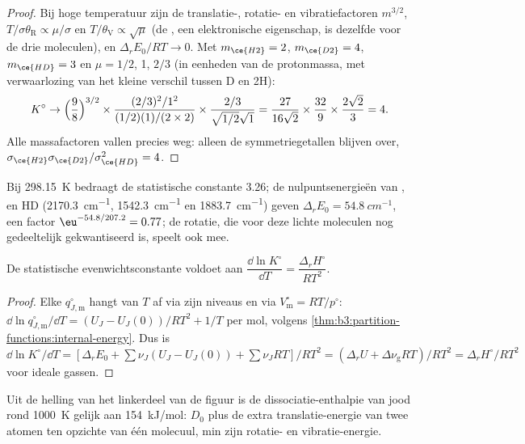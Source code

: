 \begin{proof}
Bij hoge temperatuur zijn de translatie-, rotatie- en vibratiefactoren
$m^{3/2}$, $T/\sigma\theta_{\mathrm R} \propto \mu/\sigma$ en $T/\theta_{\mathrm V} \propto \sqrt\mu$ (de
, een elektronische eigenschap, is dezelfde voor de drie
moleculen), en $\Delta_rE_0/RT \to 0$.
Met $m_{\ce{H2}} = 2$, $m_{\ce{D2}} = 4$, $m_{\ce{HD}} = 3$ en $\mu = 1/2$, 1, $2/3$ (in eenheden van de
protonmassa, met verwaarlozing van het kleine verschil tussen D en 2H):
\[
  K^\circ \to \Bigl(\frac{9}{8}\Bigr)^{3/2} \times \frac{(2/3)^2/1^2}{(1/2)(1)/(2 \times 2)}
  \times \frac{2/3}{\sqrt{1/2}\sqrt1}
  = \frac{27}{16\sqrt2} \times \frac{32}{9} \times \frac{2\sqrt2}{3} = 4 .
\]
Alle massafactoren vallen precies weg: alleen de symmetriegetallen blijven
over, $\sigma_{\ce{H2}}
\sigma_{\ce{D2}}/\sigma_{\ce{HD}}^2 = 4$.
\end{proof}

Bij \qty{298.15}{K} bedraagt de statistische constante 3.26; de
nulpuntsenergieën van ,
 en HD (\qty{2170.3}{cm^{-1}}, \qty{1542.3}{cm^{-1}} en \qty{1883.7}{cm^{-1}}) geven $\Delta_rE_0 =
\qty{54.8}{cm^{-1}}$, een factor $\eu^{-54.8/207.2} = 0.77$; de rotatie, die
voor deze lichte moleculen nog gedeeltelijk gekwantiseerd is, speelt ook
mee.

\begin{proposition}\label{prop:b3:statistical-thermo-applied:vant-hoff-stat}
De statistische evenwichtsconstante voldoet aan $\dfrac{\dd\ln K^\circ}{\dd T} = \dfrac{\Delta_rH^\circ}{RT^2}$.
\end{proposition}

\begin{proof}
Elke $q^\circ_{J,\mathrm m}$ hangt van $T$ af via zijn niveaus en via $V^\circ_{\mathrm m} = RT/p^\circ$:
$\dd\ln q^\circ_{J,\mathrm m}/\dd T = (U_J - U_J(0))/RT^2 + 1/T$ per mol, volgens
\cref{thm:b3:partition-functions:internal-energy}. Dus is $\dd\ln K^\circ/\dd T =
[\Delta_rE_0 + \sum\nu_J(U_J - U_J(0)) + \sum\nu_JRT]/RT^2 = (\Delta_rU + \Delta\nu_{\mathrm g}RT)/RT^2 =
\Delta_rH^\circ/RT^2$ voor ideale gassen.
\end{proof}

Uit de helling van het linkerdeel van de figuur is de
dissociatie-enthalpie van jood rond \qty{1000}{K} gelijk aan
\qty{154}{kJ/mol}: $D_0$ plus de extra translatie-energie van twee atomen
ten opzichte van één molecuul, min zijn rotatie- en vibratie-energie.

